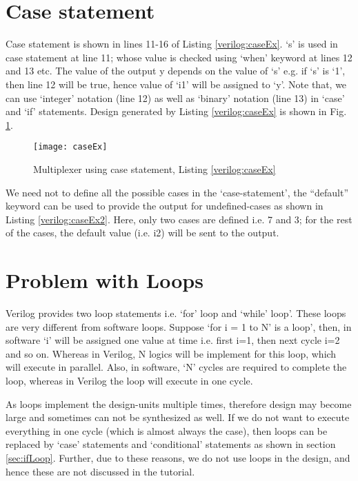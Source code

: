 \section{Case statement}
Case statement is shown in lines 11-16 of Listing \ref{verilog:caseEx}. `s' is used in case statement at line 11; whose value is checked using `when' keyword at lines 12 and 13 etc. The value of the output y depends on the value of `s' e.g. if `s' is `1', then line 12 will be true, hence value of `i1' will be assigned to `y'. Note that, we can use `integer' notation (line 12) as well as `binary' notation (line 13)  in `case' and `if' statements. Design generated by Listing \ref{verilog:caseEx} is shown in Fig. \ref{fig:caseEx}.


\begin{figure}[!h]
	\centering
	\texttt{[image: caseEx]}
	\caption{Multiplexer using case statement, Listing \ref{verilog:caseEx}}
	\label{fig:caseEx}
\end{figure}

We need not to define all the possible cases in the `case-statement', the ``default'' keyword can be used to provide the output for undefined-cases as shown in Listing \ref{verilog:caseEx2}. Here, only two cases are defined i.e. 7 and 3; for the rest of the cases, the default value (i.e. i2) will be sent to the output. 



\section{Problem with Loops}

Verilog provides two loop statements i.e. `for' loop and `while' loop'. These loops are very different from software loops. Suppose `for i = 1 to N' is a loop', then, in software `i' will be assigned one value at time i.e. first i=1, then next cycle i=2 and so on. Whereas in Verilog, N logics will be implement for this loop, which will execute in parallel. Also, in software, `N' cycles are required to complete the loop, whereas in Verilog the loop will execute in one cycle. 
\begin{noNumBox}
	As loops implement the design-units multiple times, therefore design may become large and sometimes can not be synthesized as well. If we do not want to execute everything in one cycle (which is almost always the case), then loops can be replaced by `case' statements and `conditional' statements as shown in section \ref{sec:ifLoop}. Further, due to these reasons, we do not use loops in the design, and hence these are not discussed in the tutorial.
\end{noNumBox}   
%
